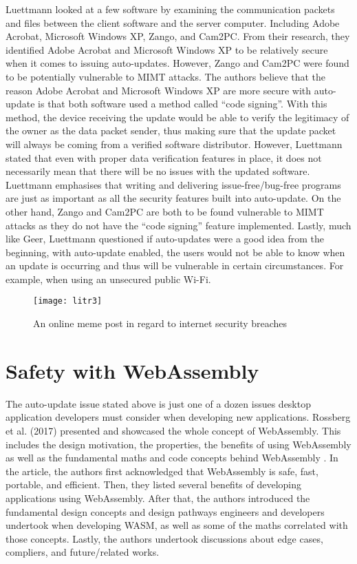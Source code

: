 Luettmann looked at a few software by examining the communication packets and files between the client software and the server computer. Including Adobe Acrobat, Microsoft Windows XP, Zango, and Cam2PC. From their research, they identified Adobe Acrobat and Microsoft Windows XP to be relatively secure when it comes to issuing auto-updates. However, Zango and Cam2PC were found to be potentially vulnerable to MIMT attacks. The authors believe that the reason Adobe Acrobat and Microsoft Windows XP are more secure with auto-update is that both software used a method called “code signing”. With this method, the device receiving the update would be able to verify the legitimacy of the owner as the data packet sender, thus making sure that the update packet will always be coming from a verified software distributor. However, Luettmann stated that even with proper data verification features in place, it does not necessarily mean that there will be no issues with the updated software. Luettmann emphasises that writing and delivering issue-free/bug-free programs are just as important as all the security features built into auto-update. On the other hand, Zango and Cam2PC are both to be found vulnerable to MIMT attacks as they do not have the “code signing” feature implemented. Lastly, much like Geer, Luettmann questioned if auto-updates were a good idea from the beginning, with auto-update enabled, the users would not be able to know when an update is occurring and thus will be vulnerable in certain circumstances. For example, when using an unsecured public Wi-Fi.

\bigskip
\begin{figure}[hp]
\centering
\texttt{[image: litr3]}
\caption{\footnotesize{An online meme post in regard to internet security breaches \cite{lit10}}}
\captionsetup{aboveskip=0pt,font=it}
\end{figure}
\bigskip

\bigskip
\section{Safety with WebAssembly}

The auto-update issue stated above is just one of a dozen issues desktop application developers must consider when developing new applications. Rossberg et al. (2017) presented and showcased the whole concept of WebAssembly. This includes the design motivation, the properties, the benefits of using WebAssembly as well as the fundamental maths and code concepts behind WebAssembly \cite{lit11}. In the article, the authors first acknowledged that WebAssembly is safe, fast, portable, and efficient. Then, they listed several benefits of developing applications using WebAssembly. After that, the authors introduced the fundamental design concepts and design pathways engineers and developers undertook when developing WASM, as well as some of the maths correlated with those concepts. Lastly, the authors undertook discussions about edge cases, compliers, and future/related works.

